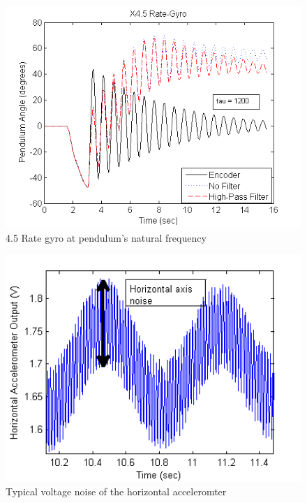\documentclass{article}
\theoremstyle{plain}
\theoremstyle{definition}
\theoremstyle{remark}
\begin{document}
\begin{figure}[hbt]
\begin{center}
\includegraphics[width = 12cm]{NormalMass_Gyro45.png}
\caption{4.5 Rate gyro at pendulum's natural frequency}
\label{normal_gyro45}
\end{center}
\end{figure}

\begin{figure}[hbt]
\begin{center}
\includegraphics[width = 12cm]{Example_Horizontal_Noise.png}
\caption{Typical voltage noise of the horizontal acceleromter}
\label{horizontalNoise}
\end{center}
\end{figure}
\end{document}
